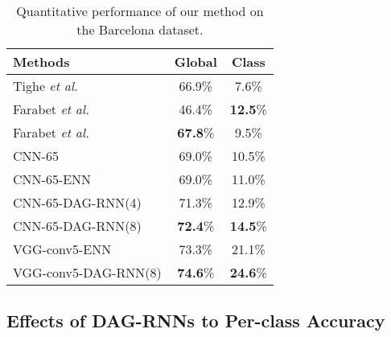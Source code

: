 \documentclass[10pt,twocolumn,letterpaper]{article}
\begin{document}
\begin{table}[t]
\footnotesize
\begin{center}
\begin{tabular}{|l|cc|}
\hline
Methods & Global & Class \\
\hline
Tighe \emph{et al.}\cite{tighe2010superparsing} & 66.9\% & 7.6\% \\
Farabet \emph{et al.} \cite{farabet2013learning} & 46.4\% & \textbf{12.5}\% \\
Farabet \emph{et al.} \cite{farabet2013learning} & \textbf{67.8}\% & 9.5\%\\
\hline
CNN-65 & 69.0\% & 10.5\% \\
CNN-65-ENN & 69.0\%  & 11.0\% \\
CNN-65-DAG-RNN(4) & 71.3\% & 12.9\% \\
CNN-65-DAG-RNN(8) & \textbf{72.4}\% & \textbf{14.5}\% \\
\hline
\hline
VGG-conv5-ENN & 73.3\% & 21.1\% \\
VGG-conv5-DAG-RNN(8) & \textbf{74.6}\% & \textbf{24.6}\% \\
\hline
\end{tabular}
\end{center}
\caption{Quantitative performance of our method on the Barcelona dataset.}
\label{Table:result_Barcelona}
\end{table}
\subsection{Effects of DAG-RNNs to Per-class Accuracy}
\end{document}
